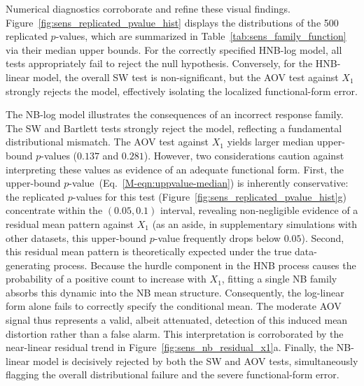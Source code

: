 \documentclass[
  12pt]{article}
\theoremstyle{plain}
\theoremstyle{definition}
\theoremstyle{remark}
\begin{document}
Numerical diagnostics corroborate and refine these visual findings. Figure~\ref{fig:sens_replicated_pvalue_hist} displays the distributions of the 500 replicated $p$-values, which are summarized in Table~\ref{tab:sens_family_function} via their median upper bounds. For the correctly specified HNB-log model, all tests appropriately fail to reject the null hypothesis. Conversely, for the HNB-linear model, the overall SW test is non-significant, but the AOV test against $X_1$ strongly rejects the model, effectively isolating the localized functional-form error.

The NB-log model illustrates the consequences of an incorrect response family. The SW and Bartlett tests strongly reject the model, reflecting a fundamental distributional mismatch. The AOV test against $X_1$ yields larger median upper-bound $p$-values ($0.137$ and $0.281$). However, two considerations caution against interpreting these values as evidence of an adequate functional form. First, the upper-bound $p$-value~(Eq.~\eqref{M-eqn:uppvalue-median}) is inherently conservative: the replicated $p$-values for this test (Figure~\ref{fig:sens_replicated_pvalue_hist}g) concentrate within the $(0.05, 0.1)$ interval, revealing non-negligible evidence of a residual mean pattern against $X_1$ (as an aside, in supplementary simulations with other datasets, this upper-bound $p$-value frequently drops below $0.05$). Second, this residual mean pattern is theoretically expected under the true data-generating process. Because the hurdle component in the HNB process causes the probability of a positive count to increase with $X_1$, fitting a single NB family absorbs this dynamic into the NB mean structure. Consequently, the log-linear form alone fails to correctly specify the conditional mean. The moderate AOV signal thus represents a valid, albeit attenuated, detection of this induced mean distortion rather than a false alarm. This interpretation is corroborated by the near-linear residual trend in Figure~\ref{fig:sens_nb_residual_x1}a. Finally, the NB-linear model is decisively rejected by both the SW and AOV tests, simultaneously flagging the overall distributional failure and the severe functional-form error.
\end{document}
